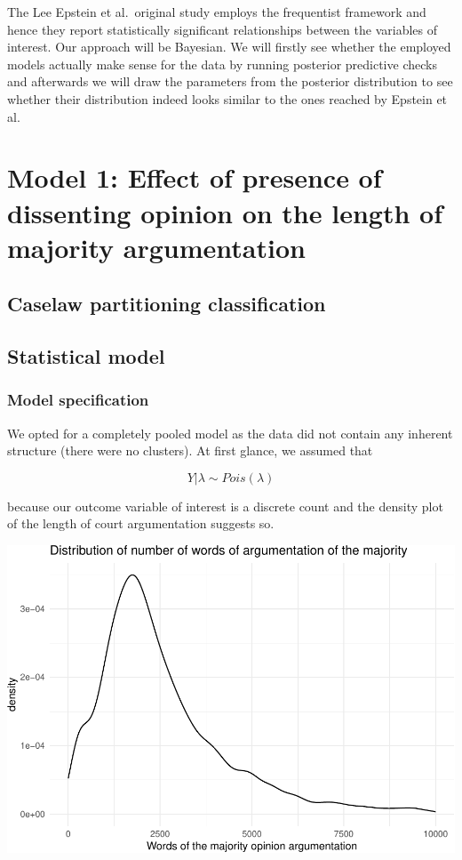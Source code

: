 \documentclass[
  11pt,
]{article}
\begin{document}
The Lee Epstein et al.~original study employs the frequentist framework
and hence they report statistically significant relationships between
the variables of interest. Our approach will be Bayesian. We will
firstly see whether the employed models actually make sense for the data
by running posterior predictive checks and afterwards we will draw the
parameters from the posterior distribution to see whether their
distribution indeed looks similar to the ones reached by Epstein et al.

\hypertarget{model-1-effect-of-presence-of-dissenting-opinion-on-the-length-of-majority-argumentation}{%
\section{Model 1: Effect of presence of dissenting opinion on the length
of majority
argumentation}\label{model-1-effect-of-presence-of-dissenting-opinion-on-the-length-of-majority-argumentation}}

\hypertarget{caselaw-partitioning-classification}{%
\subsection{Caselaw partitioning
classification}\label{caselaw-partitioning-classification}}

\hypertarget{statistical-model}{%
\subsection{Statistical model}\label{statistical-model}}

\hypertarget{model-specification}{%
\subsubsection{Model specification}\label{model-specification}}

We opted for a completely pooled model as the data did not contain any
inherent structure (there were no clusters). At first glance, we assumed
that

\[
Y | \lambda \sim Pois(\lambda)
\]

because our outcome variable of interest is a discrete count and the
density plot of the length of court argumentation suggests so.

\includegraphics{dissents_article_appendix_files/figure-latex/negbinom-1.pdf}
\end{document}
